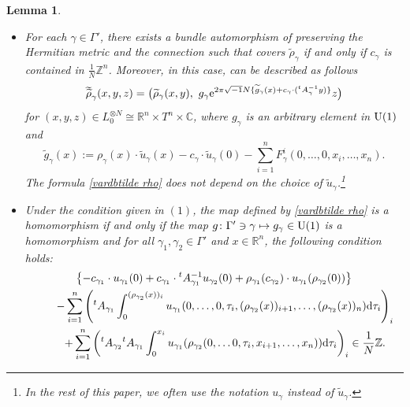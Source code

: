 \documentclass[10pt,a4paper]{amsart}
\numberwithin{equation}{section}
\newtheorem{Lemma}[Theorem]{Lemma}
\newcommand{\C}{\mathbb{C}}
\newcommand{\R}{\mathbb{R}}
\newcommand{\Z}{\mathbb{Z}}
\renewcommand{\tilde}{\widetilde}
\newcommand{\vardbtilde}[1]{\tilde{\raisebox{0pt}[0.85\height]{$\tilde{#1}$}}}
\def\Aut{\operatorname{Aut}}
\begin{document}
\begin{Lemma}\label{condition for lift of Gamma-action to tilde_L}\quad
\begin{itemize}\itemsep=0pt
\item[$(1)$] For each $\gamma\in \Gamma'$, there exists a bundle automorphism \smash{$\vardbtilde \rho_\gamma$} of  preserving the Hermitian metric and the connection such that \smash{$\vardbtilde \rho_\gamma$} covers $\tilde \rho_\gamma$
if and only if $c_\gamma$ is contained in $\frac{1}{N}\Z^n$. Moreover, in this case, \smash{$\vardbtilde \rho_\gamma$} can be described as follows
\begin{equation}\label{vardbtilde rho}
{\vardbtilde \rho}_\gamma (x,y,z)=\bigl( {\tilde \rho}_\gamma (x,y),\ g_\gamma {\rm e}^{2\pi\sqrt{-1}N\{{\tilde g}_\gamma(x)+c_\gamma\cdot ({}^tA_\gamma^{-1}y)\}}z\bigr)
\end{equation}
 for $(x,y,z)\in L_0^{\otimes N}\cong \R^n\times T^n\times \C$, where $g_\gamma$ is an arbitrary element in ${\rm U}(1)$ and
\[%
{\tilde g}_\gamma(x):=\rho_\gamma (x)\cdot {\tilde u}_\gamma(x)-c_\gamma\cdot {\tilde u}_\gamma (0)-\sum_{i=1}^nF_\gamma^i(0,\ldots ,0,x_i,\ldots ,x_n).
\]
The formula \eqref{vardbtilde rho} does not depend on the choice of ${\tilde u}_\gamma$.\footnote{In the rest of this paper, we often use the notation $u_\gamma$ instead of ${\tilde u}_\gamma$.}
\item[$(2)$] Under the condition given in $(1)$, the map \smash{$\vardbtilde \rho\colon \Gamma' \to \Aut \bigl(\bigl( L_0, \nabla^{L_0}\bigr)^{\otimes N}\bigr)$} defined by \eqref{vardbtilde rho} is a homomorphism if and only if
the map $g\colon \Gamma'\ni \gamma\mapsto g_\gamma \in {\rm U}(1)$ is a homomorphism and for all $\gamma_1, \gamma_2 \in \Gamma'$ and $x\in \R^n$, the following condition holds:
\begin{gather*}
\bigl\{-c_{\gamma_1}\cdot u_{\gamma_1}(0)+c_{\gamma_1}\cdot {}^tA_{\gamma_1}^{-1}u_{\gamma_2}(0)+\rho_{\gamma_1}(c_{\gamma_2})\cdot u_{\gamma_1}(\rho_{\gamma_2}(0))\bigr\}\\
\qquad-\sum_{i=1}^n\left({}^tA_{\gamma_1}\int_0^{(\rho_{\gamma_2}(x))_i}u_{\gamma_1}(0,\ldots ,0,\tau_i,(\rho_{\gamma_2}(x))_{i+1},\ldots ,(\rho_{\gamma_2}(x))_n){\rm d}\tau_i\right)_i \\
\qquad+\sum_{i=1}^n\left({}^tA_{\gamma_2}{}^tA_{\gamma_1}\int_0^{x_i}u_{\gamma_1}(\rho_{\gamma_2}(0,\ldots 0,\tau_i,x_{i+1},\ldots ,x_n)){\rm d}\tau_i\right)_i \in\frac{1}{N}\Z .
\end{gather*}
\end{itemize}
\end{Lemma}
\end{document}
